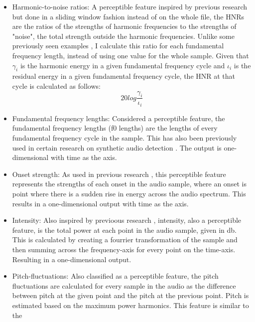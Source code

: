 \documentclass{article}
\begin{document}
			\begin{itemize}
				\item
					\sloppy
					Harmonic-to-noise ratios: A perceptible feature inspired by previous research
					\cite{chaiwongyen_contribution_2022,chaiwongyen_deepfake-speech_2023,
					li_comparative_2022} but done in a sliding window fashion instead of on the
					whole file, the HNRs are the ratios of the strengths of harmonic frequencies
					to the strengths of "noise", the total strength outside the harmonic
					frequencies. Unlike some previously seen examples
					\cite{chaiwongyen_contribution_2022, chaiwongyen_deepfake-speech_2023}, I
					calculate this ratio for each fundamental frequency length, instead of using
					one value for the whole sample. Given that \(\gamma_{i}\) is the harmonic
					energy in a given fundamental frequency cycle and \(\iota_{i}\) is the
					residual energy in a given fundamental frequency cycle, the HNR at that cycle
					is calculated as follows:
					\[ 20log\frac{\gamma_{i}}{\iota_{i}} \]
				\item
					Fundamental frequency lengths: Considered a perceptible feature, the
					fundamental frequency lengths (f0 lengths) are the lengths of every
					fundamental frequency cycle in the sample. This has also been previously used
					in certain research on synthetic audio detection \cite{xue_audio_2022}. The
					output is one-dimensional with time as the axis.
				\item
					Onset strength: As used in previous research \cite{li_comparative_2022}, this
					perceptible feature represents the strengths of each onset in the audio
					sample, where an onset is point where there is a sudden rise in energy across
					the audio spectrum. This results in a one-dimensional output with time as the
					axis.
				\item
					Intensity: Also inspired by previoous research \cite{li_comparative_2022},
					intensity, also a perceptible feature, is the total power at each point in the
					audio sample, given in db. This is calculated by creating a fourrier
					transformation of the sample and then summing across the frequency-axis for
					every point on the time-axis. Resulting in a one-dimensional output.
				\item
					Pitch-fluctuations: Also classified as a perceptible feature, the pitch
					fluctuations are calculated for every sample in the audio as the difference
					between pitch at the given point and the pitch at the previous point. Pitch is
					estimated based on the maximum power harmonics. This feature is similar to the

\end{itemize}
\end{document}
